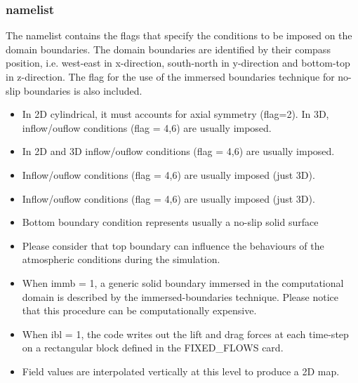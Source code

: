 \subsubsection{ namelist}
The  namelist contains the flags that specify the
conditions to be imposed on the domain boundaries. The domain boundaries
are identified by their compass position, i.e. west-east in x-direction,
south-north in y-direction and bottom-top in z-direction. The flag for the
use of the immersed boundaries technique for no-slip boundaries is also
included.
\begin{itemize}
\item
{}
{In 2D cylindrical, it must accounts for axial symmetry (flag=2). In 3D, 
inflow/ouflow conditions (flag = 4,6) are usually imposed.}

\item
{}
{In 2D and 3D inflow/ouflow conditions (flag = 4,6) are usually imposed.}

\item
{}
{Inflow/ouflow conditions (flag = 4,6) are usually imposed (just 3D).}

\item
{}
{Inflow/ouflow conditions (flag = 4,6) are usually imposed (just 3D).}

\item
{}
{Bottom boundary condition represents usually a no-slip solid surface}

\item
{}
{Please consider that top boundary can influence the behaviours of
the atmospheric conditions during the simulation.}

\item
{}
{When immb = 1, a generic solid boundary immersed in the computational domain
is described by the immersed-boundaries technique. Please notice that this 
procedure can be computationally expensive.}

\item
{}
{When ibl = 1, the code writes out the lift and drag forces at each time-step
on a rectangular block defined in the FIXED\_FLOWS card.}

\item
{}
{Field values are interpolated vertically at this level to produce a 2D map.}
\end{itemize}

